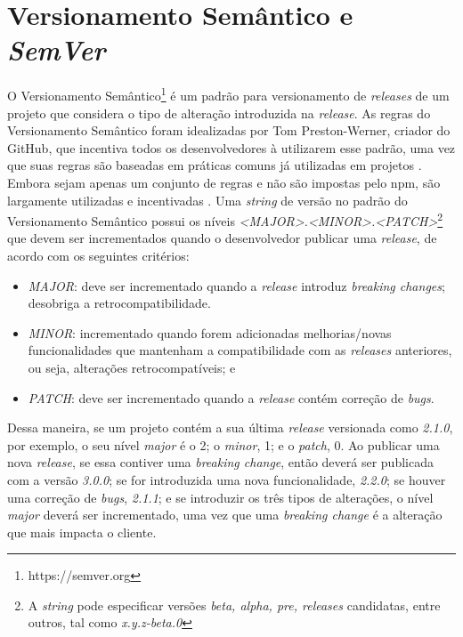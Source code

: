 \section{Versionamento Semântico e \textit{SemVer}}
\label{ref-teo:semver}

O Versionamento Semântico\footnote{https://semver.org} é um padrão para versionamento de \textit{releases} de um projeto que considera o tipo de alteração introduzida na \textit{release}. As regras do Versionamento Semântico foram idealizadas por Tom Preston-Werner, criador do \textsf{GitHub}, que incentiva todos os desenvolvedores à utilizarem esse padrão, uma vez que suas regras são baseadas em práticas comuns já utilizadas em projetos \cite{teorical_reference:semver}. Embora sejam apenas um conjunto de regras e não são impostas pelo \textsf{npm}, são largamente utilizadas e incentivadas \cite{decan}. Uma \textit{string} de versão no padrão do Versionamento Semântico possui os níveis \textit{<MAJOR>.<MINOR>.<PATCH>}\footnote{A \textit{string} pode especificar versões \textit{beta, alpha, pre, releases} candidatas, entre outros, tal como \textit{x.y.z-beta.0}} que devem ser incrementados quando o desenvolvedor publicar uma \textit{release}, de acordo com os seguintes critérios:

\begin{itemize}
    \item \textit{MAJOR}: deve ser incrementado quando a \textit{release} introduz \textit{breaking changes}; desobriga a retrocompatibilidade.
    \item \textit{MINOR}: incrementado quando forem adicionadas melhorias/novas funcionalidades que mantenham a compatibilidade com as \textit{releases} anteriores, ou seja, alterações retrocompatíveis; e
    \item \textit{PATCH}: deve ser incrementado quando a \textit{release} contém correção de \textit{bugs}.
\end{itemize}{}

Dessa maneira, se um projeto contém a sua última \textit{release} versionada como \textit{2.1.0}, por exemplo, o seu nível \textit{major} é o 2; o \textit{minor}, 1; e o \textit{patch}, 0. Ao publicar uma nova \textit{release}, se essa contiver uma \textit{breaking change}, então deverá ser publicada com a versão \textit{3.0.0}; se for introduzida uma nova funcionalidade, \textit{2.2.0}; se houver uma correção de \textit{bugs}, \textit{2.1.1}; e se introduzir os três tipos de alterações, o nível \textit{major} deverá ser incrementado, uma vez que uma \textit{breaking change} é a alteração que mais impacta o cliente.

